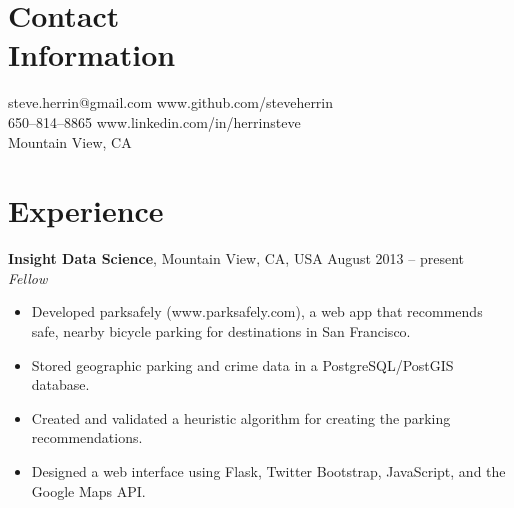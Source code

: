 \documentclass[margin,line]{resume}
\begin{document}
\begin{resume}

    \section{\mysidestyle Contact\\Information}

    steve.herrin@gmail.com		\hfill www.github.com/steveherrin		\vspace{0mm}\\\vspace{0mm}%
    650--814--8865				\hfill www.linkedin.com/in/herrinsteve	\vspace{0mm}\\\vspace{-4.5mm}%
    Mountain View, CA			\hfill								\vspace{0mm}\\\vspace{0mm}%
    
    \section{\mysidestyle Experience}
    
    \textbf{Insight Data Science}, Mountain View, CA, USA \hfill August 2013 -- present\vspace{1mm}\\\vspace{1mm}%
    \textsl{Fellow}
    \begin{itemize}
    \item Developed parksafely (www.parksafely.com), a web app that recommends safe, nearby bicycle parking for destinations in San Francisco.
    \item Stored geographic parking and crime data in a PostgreSQL/PostGIS database.
    \item Created and validated a heuristic algorithm for creating the parking recommendations.
    \item Designed a web interface using Flask, Twitter Bootstrap, JavaScript, and the Google Maps API.
    \end{itemize}


\end{resume}
\end{document}
